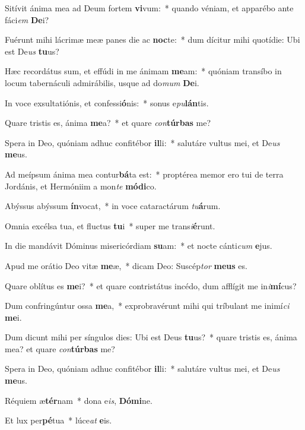 \item Sitívit ánima mea ad Deum fortem \textbf{vi}vum:~* quando véniam, et apparébo ante fáci\textit{em} \textbf{De}i?

\item Fuérunt mihi lácrimæ meæ panes die ac \textbf{noc}te:~* dum dícitur mihi quotídie: Ubi est De\textit{us} \textbf{tu}us?

\item Hæc recordátus sum, et effúdi in me ánimam \textbf{me}am:~* quóniam transíbo in locum tabernáculi admirábilis, usque ad do\textit{mum} \textbf{De}i.

\item In voce exsultatiónis, et confessi\textbf{ó}nis:~* sonus e\textit{pu}\textbf{lán}tis.

\item Quare tristis es, ánima \textbf{me}a?~* et quare \textit{con}\textbf{túr}\textbf{bas} me?

\item Spera in Deo, quóniam adhuc confitébor \textbf{il}li:~* salutáre vultus mei, et De\textit{us} \textbf{me}us.

\item Ad meípsum ánima mea contur\textbf{bá}ta est:~* proptérea memor ero tui de terra Jordánis, et Hermóniim a mon\textit{te} \textbf{mó}\textbf{di}co.

\item Abýssus abýssum \textbf{ín}vocat,~* in voce cataractárum \textit{tu}\textbf{á}rum.

\item Omnia excélsa tua, et fluctus \textbf{tu}i~* super me trans\textit{i}\textbf{é}runt.

\item In die mandávit Dóminus misericórdiam \textbf{su}am:~* et nocte cánti\textit{cum} \textbf{e}jus.

\item Apud me orátio Deo vitæ \textbf{me}æ,~* dicam Deo: Suscép\textit{tor} \textbf{me}\textbf{us} es.

\item Quare oblítus es \textbf{me}i?~* et quare contristátus incédo, dum afflígit me in\textit{i}\textbf{mí}cus?

\item Dum confringúntur ossa \textbf{me}a,~* exprobravérunt mihi qui tríbulant me inimí\textit{ci} \textbf{me}i.

\item Dum dicunt mihi per síngulos dies: Ubi est Deus \textbf{tu}us?~* quare tristis es, ánima mea? et quare \textit{con}\textbf{túr}\textbf{bas} me?

\item Spera in Deo, quóniam adhuc confitébor \textbf{il}li:~* salutáre vultus mei, et De\textit{us} \textbf{me}us.

\item Réquiem æ\textbf{tér}nam~* dona e\textit{is}, \textbf{Dó}\textbf{mi}ne.

\item Et lux per\textbf{pé}tua~* lúce\textit{at} \textbf{e}is.